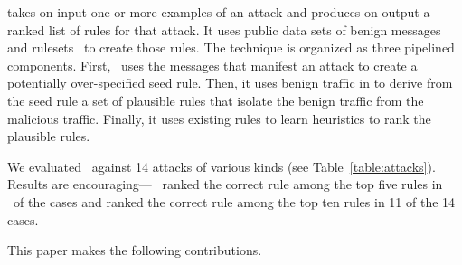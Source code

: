 \documentclass[sigconf,review, anonymous]{acmart}
\begin{document}
\tname{} takes on input one or more examples of an attack and produces
on output a ranked list of rules for that attack. It uses public data
sets of benign messages~\cite{tcpreplay,stratosphere-normal} and
rulesets~\cite{emerging-threats-open} to create those rules. The
technique is organized as three pipelined components. First,
\tname\ uses the messages that manifest an attack to create a
potentially over-specified seed rule. Then, it uses benign traffic in
to derive from the seed rule a set of plausible rules that isolate the
benign traffic from the malicious traffic. Finally, it uses existing
rules to learn heuristics to rank the plausible rules.

We evaluated \tname\ against 14 attacks of various kinds (see
Table~\ref{table:attacks}). Results are encouraging--- \tname\ ranked
the correct rule among the top five rules in \percTopFiveRanking\ of
the cases and ranked the correct rule among the top ten rules in 11 of
the 14 cases.





This paper makes the following contributions.
\end{document}
